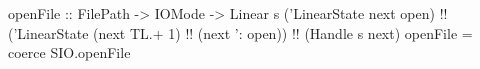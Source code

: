 \begin{code}
openFile
    :: FilePath
    -> IOMode
    -> Linear s ('LinearState next open)  !!
                ('LinearState
                    (next TL.+ 1)  !!
                    (next ': open))  !!
                (Handle s next)
openFile = coerce SIO.openFile
\end{code}
